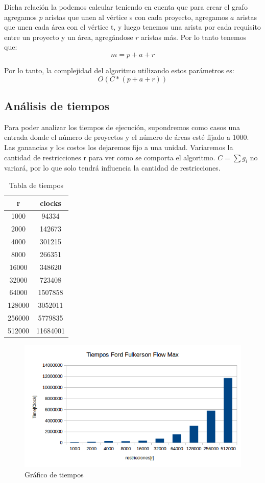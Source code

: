 Dicha relación la podemos calcular teniendo en cuenta que para crear el grafo agregamos $p$ aristas que unen al vértice s con cada proyecto, 
agregamos $a$ aristas que unen cada área con el vértice t, y luego tenemos una arista por cada requisito entre un proyecto y un área, agregándose $r$ aristas más. Por lo tanto tenemos que:
$$ m = p + a + r $$

Por lo tanto, la complejidad del algoritmo utilizando estos parámetros es:
$$ O ( C * (p +a +r)) $$

\subsection{Análisis de tiempos}
Para poder analizar los tiempos de ejecución, supondremos como casos una entrada donde el número de proyectos y el número de áreas esté fijado a 1000. Las ganancias y los costos los 
dejaremos fijo a una unidad. 
Variaremos la cantidad de restricciones r para ver como se comporta el algoritmo.
$C = \sum g_i$ no variará, por lo que solo tendrá influencia la cantidad de restricciones.


\begin{table}[H]
\centering
\begin{tabular}{|c|c|}
\hline
r 	& clocks       \\ \hline
1000    & 94334        \\ \hline
2000    & 142673       \\ \hline
4000    & 301215       \\ \hline
8000    & 266351       \\ \hline
16000   & 348620       \\ \hline
32000   & 723408       \\ \hline
64000   & 1507858      \\ \hline
128000  & 3052011      \\ \hline
256000  & 5779835      \\ \hline
512000  & 11684001     \\ \hline
\end{tabular}
\caption{Tabla de tiempos}
\end{table}

\begin{figure}[H]
\centering
\includegraphics[width=\textwidth]{FlujoDeRedes/tiempos.png}
\caption{Gráfico de tiempos}
\end{figure}

